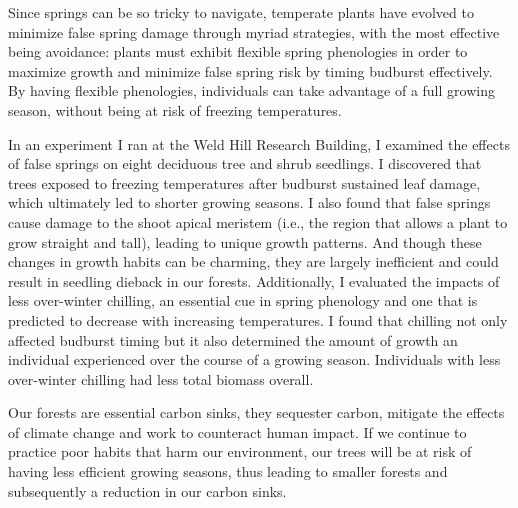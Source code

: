 \documentclass{article}\usepackage[]{graphicx}\usepackage[]{color}
\begin{document}
Since springs can be so tricky to navigate, temperate plants have evolved to minimize false spring damage through myriad strategies, with the most effective being avoidance: plants must exhibit flexible spring phenologies in order to maximize growth and minimize false spring risk by timing budburst effectively. By having flexible phenologies, individuals can take advantage of a full growing season, without being at risk of freezing temperatures.

In an experiment I ran at the Weld Hill Research Building, I examined the effects of false springs on eight deciduous tree and shrub seedlings. I discovered that trees exposed to freezing temperatures after budburst sustained leaf damage, which ultimately led to shorter growing seasons. I also found that false springs cause damage to the shoot apical meristem (i.e., the region that allows a plant to grow straight and tall), leading to unique growth patterns. And though these changes in growth habits can be charming, they are largely inefficient and could result in seedling dieback in our forests. Additionally, I evaluated the impacts of less over-winter chilling, an essential cue in spring phenology and one that is predicted to decrease with increasing temperatures. I found that chilling not only affected budburst timing but it also determined the amount of growth an individual experienced over the course of a growing season. Individuals with less over-winter chilling had less total biomass overall. 

Our forests are essential carbon sinks, they sequester carbon, mitigate the effects of climate change and work to counteract human impact. If we continue to practice poor habits that harm our environment, our trees will be at risk of having less efficient growing seasons, thus leading to smaller forests and subsequently a reduction in our carbon sinks. 


\end{document}
